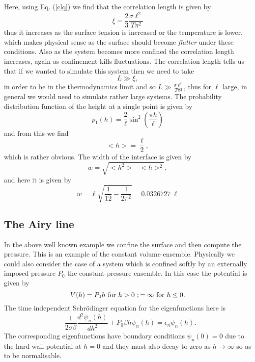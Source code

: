 Here, using Eq. (\ref{clq}) we find that  the correlation length is given by
\begin{equation}
    \xi = \frac{2}{3}\frac{\sigma \ell^2}{T\pi^2}
    \label{corel}
\end{equation}
thus it increases as the surface tension is increased or the temperature is lower, which makes physical sense as the surface should become {\em flatter} under these conditions. Also as the system becomes more confined the correlation length increases, again as  confinement  
kills fluctuations. The correlation length tells us that if we wanted to simulate this system then we need to take
\begin{equation}
    L\gg \xi ,
\end{equation}
in order to be in the thermodynamics limit and so $L \gg \frac{\sigma \ell^2}{T\pi^2}$, thus for 
$\ell$ large, in general we would need to simulate rather large systems.
The probability distribution function of the height at a single point is given by
\begin{equation}
    p_1(h) =\frac{2}{\ell}\sin^2(\frac{\pi h}{\ell})
\end{equation}
and from this we find 
\begin{equation}
    < h> = \frac{\ell}{2},  
\end{equation}
which is rather obvious. The width of the interface is given by 
\begin{equation}
    w=\sqrt{< h^2> - < h>^2},
\end{equation}
and here it is given by
\begin{equation}
    w= \ell\sqrt{\frac{1}{12}-\frac{1}{2\pi^2}}= 0.0326727\  \ell
\end{equation}

    \subsection{The Airy line}
In the  above well known example we confine the surface and then compute the pressure. This is an example of the constant volume ensemble. Physically we could also consider the case of a system which is confined softly by an externally imposed pressure $P_0$ the constant pressure ensemble. In this case the potential is given by
\begin{equation}
    V(h) = P_0 h \ {\rm for }\ h>0\ ; =\infty \ {\rm for}\ h\leq 0. 
\end{equation}
The time independent Schr\"odinger equation for the eigenfunctions here is
\begin{equation}
    -\frac{1}{2\sigma\beta}\frac{d^2 \psi_n(h)}{dh^2} + P_0\beta h \psi_n(h) = \epsilon_n\psi_n(h).
\end{equation}
The corresponding eigenfunctions have boundary conditions $\psi_n(0)=0$ due to the hard wall potential at $h=0$ and they must also decay to zero as $h\to \infty$ so as to be normalisable.


